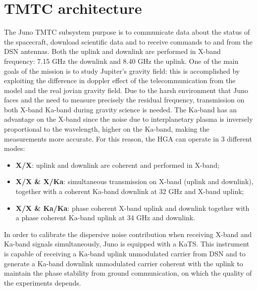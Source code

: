 \section{TMTC architecture}
\label{sec:TMTC_architecture}



The Juno TMTC subsystem purpose is to communicate data about the status of the spacecraft, download scientific data and to receive commands to and from the DSN antennas. Both the uplink and downlink are performed in X-band frequency: 7.15 GHz the downlink and 8.40 GHz the uplink. One of the main goals of the mission is to study Jupiter's gravity field: this is accomplished by exploiting the difference in doppler effect of the telecommunication from the model and the real jovian gravity field. Due to the harsh environment that Juno faces and the need to measure precisely the residual frequency, transmission on both X-band Ka-band during gravity science is needed. The Ka-band has an advantage on the X-band since the noise due to interplanetary plasma is inversely proportional to the wavelength, higher on the Ka-band, making the measurements more accurate. 
For this reason, the HGA can operate in 3 different modes: 

\begin{itemize}
\item \textbf{X/X}: uplink and downlink are coherent and performed in X-band;
\item \textbf{X/X \& X/Ka}: simultaneous transmission on X-band (uplink and downlink), together with a coherent Ka-band downlink at 32 GHz and X-band uplink;
\item \textbf{X/X \& Ka/Ka}: phase coherent X-band uplink and downlink together with a phase coherent Ka-band uplink at 34 GHz and downlink.
\end{itemize}

In order to calibrate the dispersive noise contribution when receiving X-band and Ka-band signals simultaneously, Juno is equipped with a KaTS. This instrument is capable of receiving a Ka-band uplink unmodulated carrier from DSN and to generate a Ka-band downlink unmodulated carrier coherent with the uplink to maintain the phase stability from ground communication, on which the quality of the experiments depends\cite{juno_telecommunication}.

